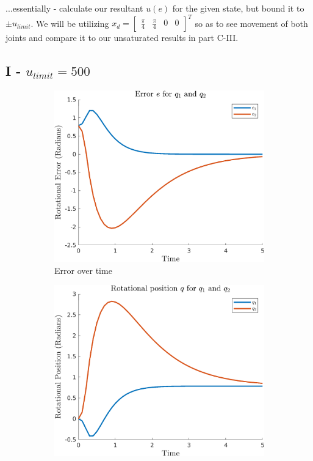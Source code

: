 \documentclass{article}
\begin{document}
...essentially - calculate our resultant $u(e)$ for the given state, but bound it to $\pm u_{limit}$. We will be utilizing $x_d=\begin{bmatrix} \frac{\pi}{4} & \frac{\pi}{4} & 0 & 0 \end{bmatrix}^T$ so as to see movement of both joints and compare it to our unsaturated results in part C-III.

\subsection*{I - $u_{limit} = 500$}

\begin{figure}[H]
    \centering
    \begin{subfigure}{0.325\textwidth}
        \centering
        \includegraphics[width = \textwidth]{figures/error-d1.png}
        \caption{Error over time}
    \end{subfigure}
    \begin{subfigure}{0.325\textwidth}
        \centering
        \includegraphics[width = \textwidth]{figures/rotational-position-d1.png}

\end{subfigure}
\end{figure}
\end{document}
